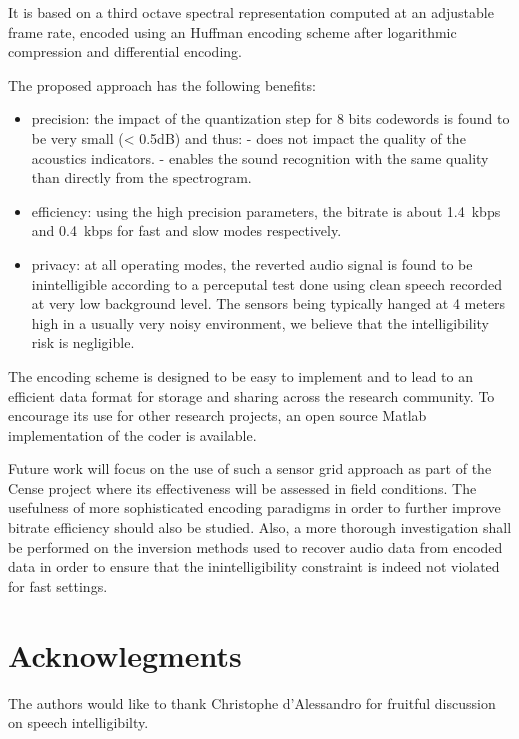 \documentclass[sensors,article,submit,moreauthors,pdftex,10pt,a4paper]{mdpi}
\begin{document}
It is based on a third octave spectral representation computed at an adjustable frame rate, encoded using an Huffman encoding scheme after logarithmic compression and differential encoding.

The proposed approach has the following benefits:
\begin{itemize}
	\item precision: the impact of the quantization step for 8 bits codewords is found to be very small (< 0.5dB) and thus:
	- does not impact the quality of the acoustics indicators.
	- enables the sound recognition with the same quality than directly from the spectrogram.
	\item efficiency: using the high precision parameters, the bitrate is about 1.4~kbps and 0.4~kbps for fast and slow modes respectively.
	\item privacy: at all operating modes, the reverted audio signal is found to be inintelligible according to a perceputal test done using clean speech recorded at very low background level. The sensors being typically hanged at 4 meters high in a usually very noisy environment, we believe that the intelligibility risk is negligible.
\end{itemize}

The encoding scheme is designed to be easy to implement and to lead to an efficient data format for storage and sharing across the research community. To encourage its use for other research projects, an open source Matlab implementation of the coder is available.



Future work will focus on the use of such a sensor grid approach as part of the Cense project where its effectiveness will be assessed in field conditions. The usefulness of more sophisticated encoding paradigms in order to further improve bitrate efficiency should also be studied. Also, a more thorough investigation shall be performed on the inversion methods used to recover audio data from encoded data in order to ensure that the inintelligibility constraint is indeed not violated for fast settings.

\section{Acknowlegments}

The authors would like to thank Christophe d'Alessandro for fruitful discussion on speech intelligibilty.

%


\end{document}
